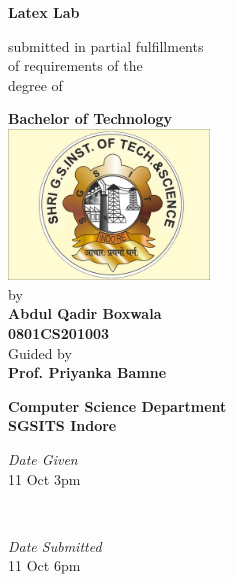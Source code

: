 \documentclass{report}
\begin{document}
\begin{titlepage}
    \begin{center}
        \vspace{1cm}
            
        \Huge
        \textbf{Latex Lab}
            
        \vspace{0.5cm}
        \LARGE
        submitted in partial fulfillments \\
        of requirements of the \\
        degree of
            
        \vspace{1.5cm}
            
        \textbf{Bachelor of Technology}\\
        \includegraphics[width=0.4\textwidth]{jpg.jpg}\\
        by \\
        \textbf{Abdul Qadir Boxwala}\\
        \textbf{0801CS201003}\\
            
        \vspace{1cm}
        Guided by\\
        \textbf{Prof. Priyanka Bamne}\\
            
        \vspace{0.8cm}
            
        
            
        \LARGE
        \textbf{Computer Science Department}\\
        \textbf{SGSITS Indore}
        
        \vspace{1cm}
        
        \begin{minipage}{0.4\textwidth}
		\begin{flushleft}
			\large
			\textit{Date Given}\\
			11 Oct 3pm
		\end{flushleft}
	   \end{minipage}
	~
    	\begin{minipage}{0.4\textwidth}
		\begin{flushright}
			\large
			\textit{Date Submitted}\\
			11 Oct 6pm
		\end{flushright}
	    \end{minipage}
            
    \end{center}
\end{titlepage}
\end{document}
